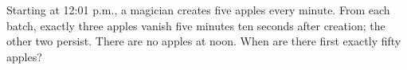 Starting at 12:01 p.m., a magician creates five apples every minute. From each batch, exactly three apples vanish five minutes ten seconds after creation; the other two persist. There are no apples at noon. When are there first exactly fifty apples?
